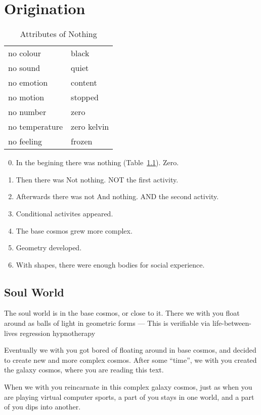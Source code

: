 \documentclass{report}
\begin{document}
\chapter{Origination}\label{origination}
\begin{table}
\begin{tabular}{l l} 
  no colour & black \\
  no sound & quiet \\
  no emotion & content \\
  no motion & stopped \\
  no number & zero \\
  no temperature & zero kelvin \\
  no feeling & frozen \\
\end{tabular}
\caption{Attributes of Nothing}\label{nothing}
\end{table}
\begin{enumerate}
\setcounter{enumi}{-1}
\item In the begining there was nothing (Table~\ref{nothing}). Zero.
\item Then there was Not nothing. NOT the first activity. 
\item Afterwards there was not And nothing. AND the second activity.
\item Conditional activites appeared. 
\item The base cosmos grew more complex. 
\item Geometry developed. 
\item With shapes, there were enough bodies for social experience.
\end{enumerate}

\section{Soul World}\label{soulWorld}

The soul world is in the base cosmos, or close to it.
There we with you float around as balls of light in geometric forms ---
This is verifiable via life-between-lives regression
hypnotherapy\cite{newtins}\cite{newton2000destiny}

Eventually we with you got bored of floating around in base cosmos,
and decided to create new and more complex cosmos.
After some ``time'', we with you created the galaxy cosmos, where you are reading this
text.

When we with you reincarnate in this complex galaxy cosmos, just as when you are 
playing virtual computer sports, a part of you stays in one world, and a part
of you dips into another.
\end{document}
